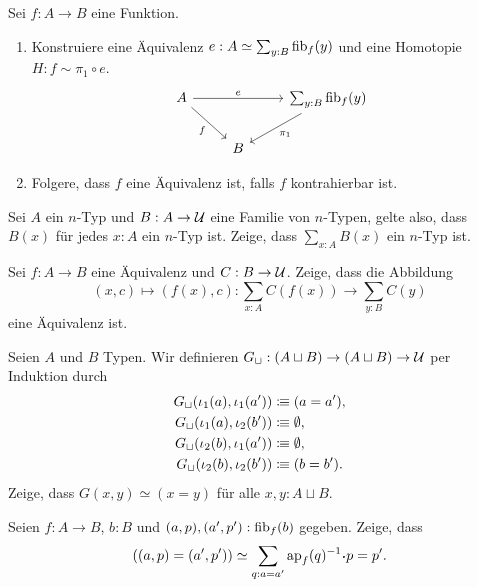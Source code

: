 \documentclass{hott-übung}
\begin{document}
\setcounter{blattnummer}{4}
\setcounter{aufgabennummer}{0}
\setlength{\belowdisplayskip}{1pt}

\blatt

  Sei \(f : A \to B\) eine Funktion.
\begin{enumerate}
  \item
    Konstruiere eine Äquivalenz \(e : A \simeq \sum_{y : B}\mathrm{fib}_f(y)\) und eine Homotopie \(H : f \sim \pi_1 \circ e\).
    \[\begin{tikzcd}
      A & & \sum_{y : B}\fib_f(y) \\
      & B
      \arrow[from=1-1,to=1-3,"e"]
      \arrow[to=2-2,from=1-3,"\pi_1"]
      \arrow[from=1-1,to=2-2,"f"']
    \end{tikzcd}\]
  \item
    Folgere, dass \(f\) eine Äquivalenz ist, falls \(f\) kontrahierbar ist.
\end{enumerate}

Sei \(A\) ein \(n\)-Typ und \(B : A \to \mathcal{U}\) eine Familie von \(n\)-Typen, gelte also, dass \(B(x)\) für jedes \(x : A\) ein \(n\)-Typ ist.
Zeige, dass \(\sum_{x : A}B(x)\) ein \(n\)-Typ ist.

\aufgabe{}
Sei \(f : A \to B\) eine Äquivalenz und \(C : B \to \mathcal{U}\).
Zeige, dass die Abbildung
\[(x,c) \mapsto (f(x),c) : \sum_{x:A}C(f(x)) \to \sum_{y:B}C(y)\]
eine Äquivalenz ist.

  Seien \(A\) und \(B\) Typen.
  Wir definieren \(G_\sqcup : (A \sqcup B) \to (A\sqcup B) \to \mathcal{U}\) per Induktion durch
  \setlength{\belowdisplayskip}{1em}
  \begin{align*}
    G_\sqcup(\iota_1(a),\iota_1(a')) & \vcentcolon\mspace{-1.2mu}\equiv (a=a'), \\
    G_\sqcup(\iota_1(a),\iota_2(b')) & \vcentcolon\mspace{-1.2mu}\equiv \emptyset, \\
    G_\sqcup(\iota_2(b),\iota_1(a')) & \vcentcolon\mspace{-1.2mu}\equiv \emptyset, \\
    G_\sqcup(\iota_2(b),\iota_2(b')) & \vcentcolon\mspace{-1.2mu}\equiv (b=b').
  \end{align*}
  Zeige, dass \(G(x,y) \simeq (x = y)\) für alle \(x,y : A \sqcup B\).

  Seien \(f : A \to B\), \(b : B\) und \((a,p), (a',p') : \mathrm{fib}_f(b)\) gegeben.
  Zeige, dass \[((a,p) = (a',p')) \simeq \sum_{q : a = a'}\ap_f(q)^{-1}\kon p = p'.\]
\end{document}
